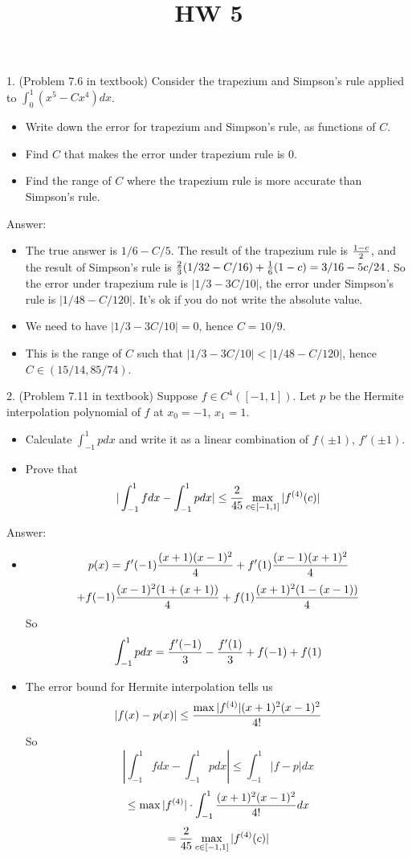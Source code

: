 \documentclass[20pt]{article} %
\title{HW 5}
\theoremstyle{break}
\begin{document}
\maketitle

1. (Problem 7.6 in textbook) Consider the trapezium and Simpson's rule applied to $\int_0^1(x^5-Cx^4)dx$.
\begin{itemize}
\item Write down the error for trapezium and Simpson's rule, as functions of $C$.
\item Find $C$ that makes the error under trapezium rule is $0$.
\item Find the range of $C$ where the trapezium rule is more accurate than Simpson's rule.
\end{itemize}

Answer:
\begin{itemize}
\item The true answer is $1/6-C/5$. The result of the trapezium rule is ${1-c\over 2}$, and the result of Simpson's rule is ${2\over 3}(1/32-C/16)+{1\over 6}(1-c)=3/16-{5c/24}$. So the error under trapezium rule is $|1/3-3C/10|$, the error under Simpson's rule is $|1/48-C/120|$. It's ok if you do not write the absolute value.
\item We need to have $|1/3-3C/10|=0$, hence $C=10/9$.
\item This is the range of $C$ such that $|1/3-3C/10|<|1/48-C/120|$, hence $C\in (15/14, 85/74)$.
\end{itemize}


2. (Problem 7.11 in textbook) Suppose $f\in C^4([-1, 1])$. Let $p$ be the Hermite interpolation polynomial of $f$ at $x_0=-1$, $x_1=1$.
\begin{itemize}
\item Calculate $\int_{-1}^1pdx$ and write it as a linear combination of $f(\pm 1)$, $f'(\pm 1)$.
\item Prove that
  \[|\int_{-1}^1fdx-\int_{-1}^1pdx|\leq {2\over 45}\max_{c\in [-1, 1]}|f^{(4)}(c)|\]
\end{itemize}

Answer:
\begin{itemize}
\item
  \[p(x)=f'(-1){(x+1)(x-1)^2\over 4}+f'(1){(x-1)(x+1)^2\over 4}\]
  \[+f(-1){(x-1)^2(1+(x+1))\over 4}+f(1){(x+1)^2(1-(x-1))\over 4}\]
  So
  \[\int_{-1}^1 pdx={f'(-1)\over 3}-{f'(1)\over 3}+f(-1)+f(1)\]
\item The error bound for Hermite interpolation tells us
  \[|f(x)-p(x)|\leq {\max|f^{(4)}|(x+1)^2(x-1)^2\over 4!}\]
  So
  \[|\int_{-1}^1fdx-\int_{-1}^1pdx|\leq \int_{-1}^1|f-p|dx\]
  \[\leq \max|f^{(4)}|\cdot \int_{-1}^1 {(x+1)^2(x-1)^2\over 4!}dx\]
    \[={2\over 45}\max_{c\in [-1, 1]}|f^{(4)}(c)|\]
\end{itemize}
\end{document}
